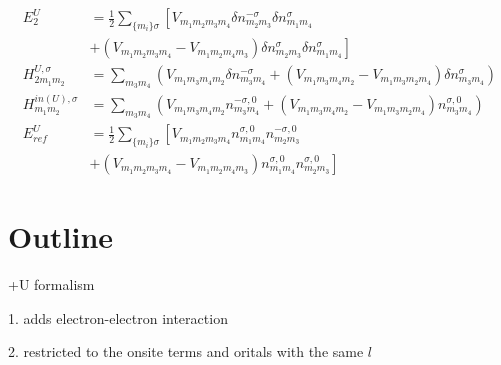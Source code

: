 %
\begin{equation}
\begin{split}
E_{2}^{U}&=\frac{1}{2}\sum_{\{m_i\}\sigma}\left [V_{m_1m_2m_3m_4}\delta n_{m_2m_3}^{-\sigma}\delta n_{m_1m_4}^{\sigma}\right. \\&\left.+
(V_{m_1m_2m_3m_4}-V_{m_1m_2m_4m_3})
\delta n_{m_2m_3}^{\sigma}\delta n_{m_1m_4}^{\sigma}\right]\\
H^{U,\sigma}_{2m_1m_2}&=\sum_{m_3m_4}(V_{m_1m_3m_4m_2}
\delta n_{m_3m_4}^{-\sigma}+(V_{m_1m_3m_4m_2}-V_{m_1m_3m_2m_4})\delta n_{m_3m_4}^{\sigma})\\
H^{in(U), \sigma}_{m_1m_2}&=\sum_{m_3m_4}(V_{m_1m_3m_4m_2}
n_{m_3m_4}^{-\sigma,0}+(V_{m_1m_3m_4m_2}-V_{m_1m_3m_2m_4})n_{m_3m_4}^{\sigma,0})\\
E^{U}_{ref}&=\frac{1}{2}\sum_{\{m_i\}\sigma}\left[V_{m_1m_2m_3m_4}n_{m_1m_4}^{\sigma, 0}n_{m_2m_3}^{-\sigma,0}\right. \\ &\left.+(V_{m_1m_2m_3m_4}-V_{m_1m_2m_4m_3})
n_{m_1m_4}^{\sigma, 0}n_{m_2m_3}^{\sigma,0}\right]
\end{split}
\end{equation}
%
\section{Outline}
+U formalism
\par{1. adds electron-electron interaction}
\par{2. restricted to the onsite terms and oritals with the same $l$}


